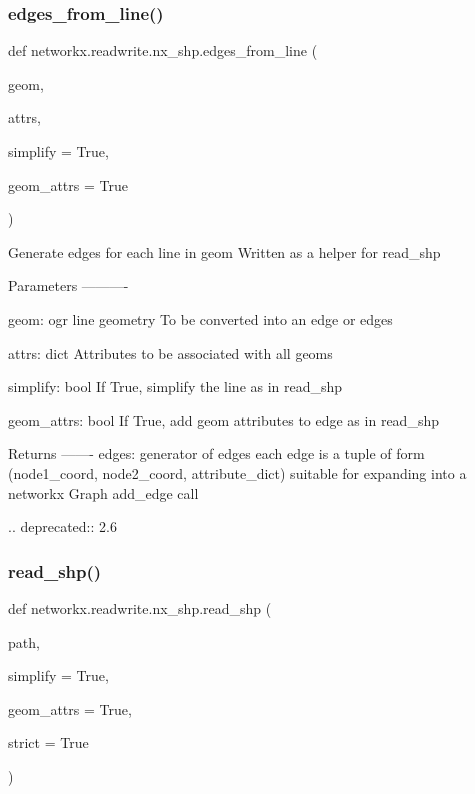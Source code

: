 \subsubsection{\texorpdfstring{edges\+\_\+from\+\_\+line()}{edges\_from\_line()}}
{\footnotesize\ttfamily def networkx.\+readwrite.\+nx\+\_\+shp.\+edges\+\_\+from\+\_\+line (\begin{DoxyParamCaption}\item[{}]{geom,  }\item[{}]{attrs,  }\item[{}]{simplify = {\ttfamily True},  }\item[{}]{geom\+\_\+attrs = {\ttfamily True} }\end{DoxyParamCaption})}

\begin{DoxyVerb}Generate edges for each line in geom
Written as a helper for read_shp

Parameters
----------

geom:  ogr line geometry
    To be converted into an edge or edges

attrs:  dict
    Attributes to be associated with all geoms

simplify:  bool
    If True, simplify the line as in read_shp

geom_attrs:  bool
    If True, add geom attributes to edge as in read_shp


Returns
-------
 edges:  generator of edges
    each edge is a tuple of form
    (node1_coord, node2_coord, attribute_dict)
    suitable for expanding into a networkx Graph add_edge call

.. deprecated:: 2.6
\end{DoxyVerb}
 \mbox{\label{namespacenetworkx_1_1readwrite_1_1nx__shp_aeb1154cdcdd9fb9f0b7e847a480f4bb6}} 
\subsubsection{\texorpdfstring{read\+\_\+shp()}{read\_shp()}}
{\footnotesize\ttfamily def networkx.\+readwrite.\+nx\+\_\+shp.\+read\+\_\+shp (\begin{DoxyParamCaption}\item[{}]{path,  }\item[{}]{simplify = {\ttfamily True},  }\item[{}]{geom\+\_\+attrs = {\ttfamily True},  }\item[{}]{strict = {\ttfamily True} }\end{DoxyParamCaption})}

